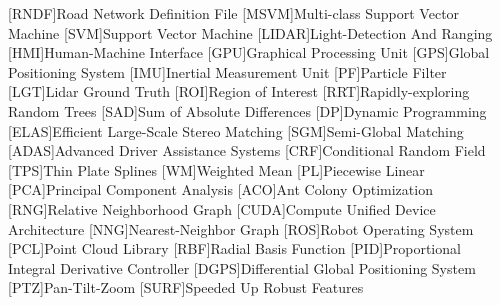 [RNDF]{Road Network Definition File}
[MSVM]{Multi-class Support Vector Machine}
[SVM]{Support Vector Machine}
[LIDAR]{Light-Detection And Ranging}
[HMI]{Human-Machine Interface}
[GPU]{Graphical Processing Unit}
[GPS]{Global Positioning System}
[IMU]{Inertial Measurement Unit}
[PF]{Particle Filter}
[LGT]{Lidar Ground Truth}
[ROI]{Region of Interest}
[RRT]{Rapidly-exploring Random Trees}
[SAD]{Sum of Absolute Differences}
[DP]{Dynamic Programming}
[ELAS]{Efficient Large-Scale Stereo Matching}
[SGM]{Semi-Global Matching}
[ADAS]{Advanced Driver Assistance Systems}
[CRF]{Conditional Random Field}
[TPS]{Thin Plate Splines}
[WM]{Weighted Mean}
[PL]{Piecewise Linear}
[PCA]{Principal Component Analysis}
[ACO]{Ant Colony Optimization}
[RNG]{Relative Neighborhood Graph}
[CUDA]{Compute Unified Device Architecture}
[NNG]{Nearest-Neighbor Graph}
[ROS]{Robot Operating System}
[PCL]{Point Cloud Library}
[RBF]{Radial Basis Function}
[PID]{Proportional Integral Derivative Controller}
[DGPS]{Differential Global Positioning System}
[PTZ]{Pan-Tilt-Zoom}
[SURF]{Speeded Up Robust Features}

